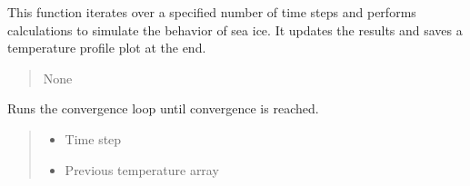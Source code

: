 \documentclass[a4paper,11pt,english,openany]{sphinxmanual}
\begin{document}
\begin{fulllineitems}
\begin{fulllineitems}
\sphinxAtStartPar
This function iterates over a specified number of time steps and performs calculations
to simulate the behavior of sea ice. It updates the results and saves a temperature profile
plot at the end.
\begin{quote}\begin{description}
\sphinxAtStartPar
{}

\sphinxAtStartPar
None

\end{description}\end{quote}

\end{fulllineitems}


\begin{fulllineitems}
\label{\detokenize{api/spyice.models.sea_ice_model:spyice.models.sea_ice_model.SeaIceModel.run_while_convergence_iteration}}
\pysigstartsignatures
{}
\pysigstopsignatures
\sphinxAtStartPar
Runs the convergence loop until convergence is reached.
\begin{quote}\begin{description}
\begin{itemize}
\item {} 
\sphinxAtStartPar
{} \textendash{} Time step

\item {} 
\sphinxAtStartPar
{} \textendash{} Previous temperature array


\end{itemize}
\end{description}
\end{quote}
\end{fulllineitems}
\end{fulllineitems}
\end{document}
